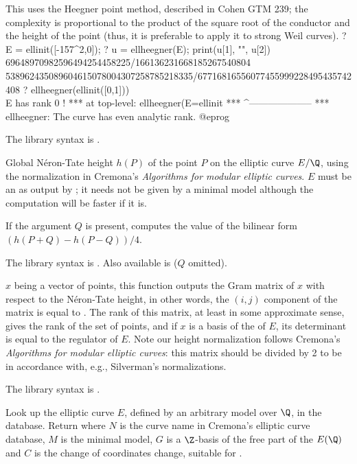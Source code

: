 This uses the Heegner point method, described in Cohen GTM 239; the complexity
is proportional to the product of the square root of the conductor and the
height of the point (thus, it is preferable to apply it to strong Weil curves).
\bprog
? E = ellinit([-157^2,0]);
? u = ellheegner(E); print(u[1], "\n", u[2])
69648970982596494254458225/166136231668185267540804
538962435089604615078004307258785218335/67716816556077455999228495435742408
? ellheegner(ellinit([0,1]))         \\ E has rank 0 !
 ***   at top-level: ellheegner(E=ellinit
 ***                 ^--------------------
 *** ellheegner: The curve has even analytic rank.
@eprog

The library syntax is .

\label{se:ellheight}
Global N\'eron-Tate height $h(P)$ of the point $P$ on the elliptic curve
$E/\Q$, using the normalization in Cremona's \emph{Algorithms for modular
elliptic curves}. $E$ must be an  as output by ; it
needs not be given by a minimal model although the computation will be faster
if it is.

If the argument $Q$ is present, computes the value of the bilinear
form $(h(P+Q)-h(P-Q)) / 4$.

The library syntax is .
Also available is 
($Q$ omitted).

\label{se:ellheightmatrix}
$x$ being a vector of points, this
function outputs the Gram matrix of $x$ with respect to the N\'eron-Tate
height, in other words, the $(i,j)$ component of the matrix is equal to
. The rank of this matrix, at least in some
approximate sense, gives the rank of the set of points, and if $x$ is a
basis of the  of $E$, its determinant is equal to
the regulator of $E$. Note our height normalization follows Cremona's
\emph{Algorithms for modular elliptic curves}: this matrix should be divided
by 2 to be in accordance with, e.g., Silverman's normalizations.

The library syntax is .

\label{se:ellidentify}
Look up the elliptic curve $E$, defined by an arbitrary model over $\Q$,
in the  database.
Return \kbd{[[N, M, G], C]}  where $N$ is the curve name in Cremona's
elliptic curve database, $M$ is the minimal model, $G$ is a $\Z$-basis of
the free part of the  $E(\Q)$ and $C$ is the
change of coordinates change, suitable for .


